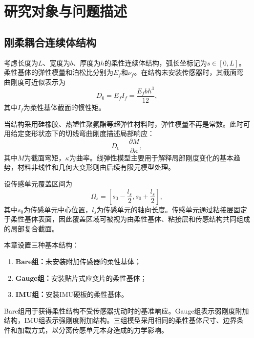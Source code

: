 \section{研究对象与问题描述}
\label{sec:sensor_influence_problem}

\subsection{刚柔耦合连续体结构}

考虑长度为$L$、宽度为$b$、厚度为$h$的柔性连续体结构，弧长坐标记为$s\in[0,L]$。柔性基体的弹性模量和泊松比分别为$E_f$和$\nu_f$。在结构未安装传感器时，其截面弯曲刚度可近似表示为
\begin{equation}
    D_0
    =E_f I_f
    =\frac{E_f b h^3}{12},
    \label{eq:bare_flexural_rigidity}
\end{equation}
其中$I_f$为柔性基体截面的惯性矩。

当结构采用硅橡胶、热塑性聚氨酯等超弹性材料时，弹性模量不再是常数。此时可用给定变形状态下的切线弯曲刚度描述局部响应：
\begin{equation}
    D_{\mathrm t}
    =\frac{\partial M}{\partial\kappa},
    \label{eq:tangent_flexural_rigidity}
\end{equation}
其中$M$为截面弯矩，$\kappa$为曲率。线弹性模型主要用于解释局部刚度变化的基本趋势，材料非线性和几何大变形则由后续有限元模型处理。

设传感单元覆盖区间为
\begin{equation}
    \Omega_s
    =
    \left[
    s_0-\frac{l_s}{2},
    s_0+\frac{l_s}{2}
    \right],
    \label{eq:sensor_coverage_interval}
\end{equation}
其中$s_0$为传感单元中心位置，$l_s$为传感单元的轴向长度。传感单元通过粘接层固定于柔性基体表面，因此覆盖区域可被视为由柔性基体、粘接层和传感结构共同组成的局部复合截面。

本章设置三种基本结构：

\begin{enumerate}
    \item \textbf{Bare组：}未安装附加传感器的柔性基体；
    \item \textbf{Gauge组：}安装贴片式应变片的柔性基体；
    \item \textbf{IMU组：}安装IMU硬板的柔性基体。
\end{enumerate}

Bare组用于获得柔性结构不受传感器扰动时的基准响应。Gauge组表示弱刚度附加结构，IMU组表示强刚度附加结构。三组模型采用相同的柔性基体尺寸、边界条件和加载方式，以分离传感单元本身造成的力学影响。


